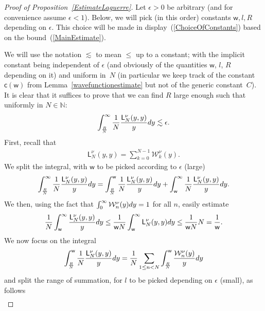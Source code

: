 \documentclass[11pt]{article}
\numberwithin{equation}{section}
\begin{document}
\begin{proof}[Proof of Proposition~\ref{EstimateLaguerre}]
Let $\epsilon>0$ be arbitrary (and for convenience assume $\epsilon<1$). Below, we will pick (in this order) constants $\mathsf{w}, l, R$ depending on $\epsilon$. This choice will be made in display~(\ref{ChoiceOfConstants}) based on the bound~(\ref{MainEstimate}).

We will use the notation $\lesssim$ to mean $\le$ up to a constant; with the implicit constant being independent of $\epsilon$ (and obviously of the quantities $\mathsf{w}$, $l$, $R$ depending on it) and uniform in~$N$ (in particular we keep track of the constant $\mathsf{c}(\mathsf{w})$ from Lemma~\ref{wavefunctionestimate} but not of the generic constant~$C$). It is clear that it suffices to prove that we can find $R$ large enough such that uniformly in $N \in \mathbb{N}$:
\begin{gather*}
\int_{\frac{R}{N}}^{\infty}\frac{1}{N}\frac{\mathsf{L}_N^{\nu}(y,y)}{y}{\rm d}y \lesssim \epsilon.
\end{gather*}
First, recall that
\begin{gather*}
\mathsf{L}_N^{\nu}(y,y)=\sum_{k=0}^{N-1}\mathcal{W}_k^\nu(y).
\end{gather*}
We split the integral, with $\mathsf{w}$ to be picked according to $\epsilon$ (large)
\begin{gather*}
\int_{\frac{R}{N}}^{\infty}\frac{1}{N}\frac{\mathsf{L}_N^{\nu}(y,y)}{y}{\rm d} y= \int_{\frac{R}{N}}^{\mathsf{w}}\frac{1}{N}\frac{\mathsf{L}_N^{\nu}(y,y)}{y}{\rm d}y +\int_{\mathsf{w}}^{\infty}\frac{1}{N}\frac{\mathsf{L}_N^{\nu}(y,y)}{y}{\rm d}y.
\end{gather*}
We then, using the fact that $\int_{0}^{\infty}\mathcal{W}_n^{\nu}(y){\rm d}y=1$ for all $n$, easily estimate
\begin{gather*}
\frac{1}{N}\int_{\mathsf{w}}^{\infty}\frac{\mathsf{L}_N^{\nu}(y,y)}{y}{\rm d}y\le\frac{1}{\mathsf{w}N} \int_{\mathsf{w}}^{\infty}\mathsf{L}_N^{\nu}(y,y){\rm d}y \le \frac{1}{\mathsf{w}N}N=\frac{1}{\mathsf{w}}.
\end{gather*}
We now focus on the integral
\begin{gather*}
\int_{\frac{R}{N}}^{\mathsf{w}}\frac{1}{N}\frac{\mathsf{L}_N^{\nu}(y,y)}{y}{\rm d}y =\frac{1}{N}\sum_{1 \le n < N}^{} \int_{\frac{R}{N}}^{\mathsf{w}}\frac{\mathcal{W}_n^{\nu}(y)}{y}{\rm d}y
\end{gather*}
and split the range of summation, for $l$ to be picked depending on $\epsilon$ (small), as follows
\begin{gather*}

\end{gather*}
\end{proof}
\end{document}
